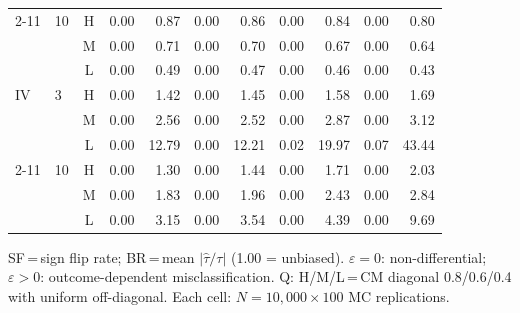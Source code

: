 \begin{table}[t]
\begin{tabular}{llcrrrrrrrr}
\cmidrule{2-11}
 & 10 & H & 0.00 & 0.87 & 0.00 & 0.86 & 0.00 & 0.84 & 0.00 & 0.80 \\
 &  & M & 0.00 & 0.71 & 0.00 & 0.70 & 0.00 & 0.67 & 0.00 & 0.64 \\
 &  & L & 0.00 & 0.49 & 0.00 & 0.47 & 0.00 & 0.46 & 0.00 & 0.43 \\
\midrule
IV & 3 & H & 0.00 & 1.42 & 0.00 & 1.45 & 0.00 & 1.58 & 0.00 & 1.69 \\
 &  & M & 0.00 & 2.56 & 0.00 & 2.52 & 0.00 & 2.87 & 0.00 & 3.12 \\
 &  & L & 0.00 & 12.79 & 0.00 & 12.21 & 0.02 & 19.97 & 0.07 & 43.44 \\
\cmidrule{2-11}
 & 10 & H & 0.00 & 1.30 & 0.00 & 1.44 & 0.00 & 1.71 & 0.00 & 2.03 \\
 &  & M & 0.00 & 1.83 & 0.00 & 1.96 & 0.00 & 2.43 & 0.00 & 2.84 \\
 &  & L & 0.00 & 3.15 & 0.00 & 3.54 & 0.00 & 4.39 & 0.00 & 9.69 \\
\bottomrule
\end{tabular}
\vspace{1mm}
\parbox{\textwidth}{\footnotesize SF\,=\,sign flip rate; BR\,=\,mean $|\hat\tau/\tau|$ (1.00 = unbiased). $\varepsilon\!=\!0$: non-differential; $\varepsilon\!>\!0$: outcome-dependent misclassification. Q: H/M/L\,=\,CM diagonal 0.8/0.6/0.4 with uniform off-diagonal. Each cell: $N\!=\!10{,}000\!\times\!100$ MC replications.}
\end{table}
